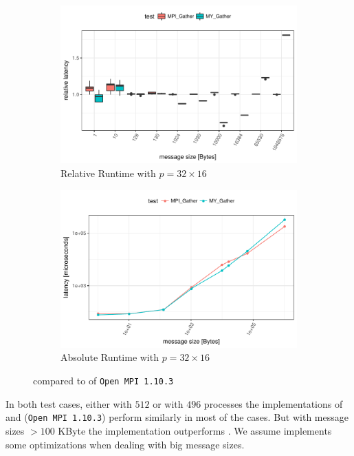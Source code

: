 \begin{figure}[H]
    \begin{subfigure}[b]{0.49\textwidth}
        \includegraphics[width=\textwidth]{../benchmarks/openmpi/binom/gather_32/rel_runtime.pdf}
        \caption{Relative Runtime with $p=32 \times 16$}
        \label{fig:Gather:OpenMPI:Rel:32}
    \end{subfigure}
    \begin{subfigure}[b]{0.49\textwidth}
        \includegraphics[width=\textwidth]{../benchmarks/openmpi/binom/gather_32/runtime.pdf}
        \caption{Absolute Runtime with $p=32 \times 16$}
        \label{fig:Gather:OpenMPI:Abs:32}
    \end{subfigure}
    
    \caption{\mygather compared to \mpigather of \texttt{Open MPI 1.10.3}}
\end{figure}

In both test cases, either with $512$ or with $496$ processes the implementations of \mygather and \mpigather (\texttt{Open MPI 1.10.3}) perform similarly in most of the cases. 
But with message sizes $> 100$ KByte the \mpigather implementation outperforms \mygather. We assume \mpigather implements some optimizations when dealing with big message sizes.


